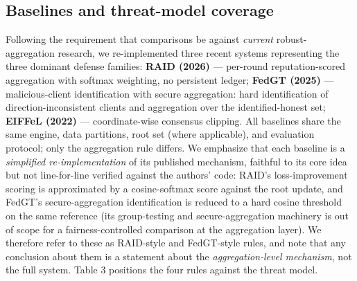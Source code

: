\documentclass[cmc,article,submit,moreauthors,pdftex]{Definitions/tsp}
\begin{document}
\subsection{Baselines and threat-model coverage}\label{sec:baselines-and-threat-model-coverage}

Following the requirement that comparisons be against \emph{current} robust-aggregation research, we re-implemented three recent systems representing the three dominant defense families: \textbf{RAID (2026)} \cite{ref-21} --- per-round reputation-scored aggregation with softmax weighting, no persistent ledger; \textbf{FedGT (2025)} \cite{ref-41} --- malicious-client identification with secure aggregation: hard identification of direction-inconsistent clients and aggregation over the identified-honest set; \textbf{EIFFeL (2022)} \cite{ref-20} --- coordinate-wise consensus clipping. All baselines share the same engine, data partitions, root set (where applicable), and evaluation protocol; only the aggregation rule differs. We emphasize that each baseline is a \emph{simplified re-implementation} of its published mechanism, faithful to its core idea but not line-for-line verified against the authors' code: RAID's loss-improvement scoring is approximated by a cosine-softmax score against the root update, and FedGT's secure-aggregation identification is reduced to a hard cosine threshold on the same reference (its group-testing and secure-aggregation machinery is out of scope for a fairness-controlled comparison at the aggregation layer). We therefore refer to these as RAID-style and FedGT-style rules, and note that any conclusion about them is a statement about the \emph{aggregation-level mechanism}, not the full system. Table 3 positions the four rules against the threat model.
\end{document}
